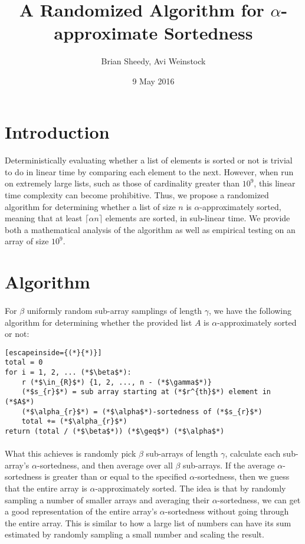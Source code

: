 \documentclass{article}
\title{A Randomized Algorithm for $\alpha$-approximate Sortedness}
\date{9 May 2016}
\author{Brian Sheedy, Avi Weinstock}
\begin{document}
\maketitle{}
\section{Introduction}
\paragraph{}Deterministically evaluating whether a list of elements is sorted or not is trivial to do in linear time by comparing each element to the next.
However, when run on extremely large lists, such as those of cardinality greater than $10^9$, this linear time complexity can become prohibitive.
Thus, we propose a randomized algorithm for determining whether a list of size $n$ is $\alpha$-approximately sorted, meaning that at least $\lceil\alpha n\rceil$ elements are sorted, in sub-linear time.
We provide both a mathematical analysis of the algorithm as well as empirical testing on an array of size $10^9$.
\section{Algorithm}
\paragraph{}For $\beta$ uniformly random sub-array samplings of length $\gamma$, we have the following algorithm for determining whether the provided list $A$ is $\alpha$-approximately sorted or not:
\begin{lstlisting}[escapeinside={(*}{*)}]
total = 0
for i = 1, 2, ... (*$\beta$*):
    r (*$\in_{R}$*) {1, 2, ..., n - (*$\gamma$*)}
    (*$s_{r}$*) = sub array starting at (*$r^{th}$*) element in (*$A$*)
    (*$\alpha_{r}$*) = (*$\alpha$*)-sortedness of (*$s_{r}$*)
    total += (*$\alpha_{r}$*)
return (total / (*$\beta$*)) (*$\geq$*) (*$\alpha$*)
\end{lstlisting}
\paragraph{}What this achieves is randomly pick $\beta$ sub-arrays of length $\gamma$, calculate each sub-array's $\alpha$-sortedness, and then average over all $\beta$ sub-arrays.
 If the average $\alpha$-sortedness is greater than or equal to the specified $\alpha$-sortedness, then we guess that the entire array is $\alpha$-approximately sorted.
The idea is that by randomly sampling a number of smaller arrays and averaging their $\alpha$-sortedness, we can get a good representation of the entire array's $\alpha$-sortedness without going through the entire array.
 This is similar to how a large list of numbers can have its sum estimated by randomly sampling a small number and scaling the result.
\end{document}
